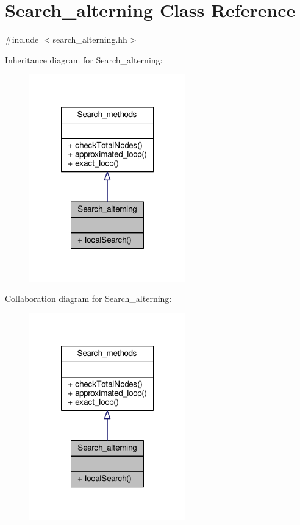 \hypertarget{classSearch__alterning}{\section{Search\-\_\-alterning Class Reference}
\label{classSearch__alterning}
}


{\ttfamily \#include $<$search\-\_\-alterning.\-hh$>$}



Inheritance diagram for Search\-\_\-alterning\-:
\nopagebreak
\begin{figure}[H]
\begin{center}
\leavevmode
\includegraphics[width=192pt]{classSearch__alterning__inherit__graph}
\end{center}
\end{figure}


Collaboration diagram for Search\-\_\-alterning\-:
\nopagebreak
\begin{figure}[H]
\begin{center}
\leavevmode
\includegraphics[width=192pt]{classSearch__alterning__coll__graph}
\end{center}
\end{figure}
